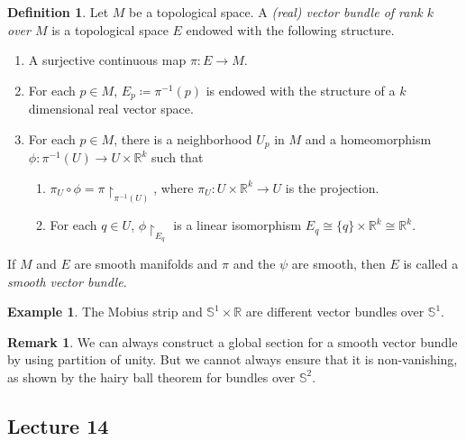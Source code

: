 \documentclass[10pt,letterpaper,cm]{nupset}
\theoremstyle{definition}
\newtheorem*{definition}{Definition}
\newtheorem{exmp}{Example}
\newtheorem{remark}{Remark}
\newcommand{\R}{\mathbb R}
\renewcommand{\S}{\mathbb S}
\newcommand{\1}{\mathbf{1}}
\newcommand{\0}{\vec 0}
\begin{document}
\begin{definition}
Let $M$ be a topological space. A \textit{(real) vector bundle of rank $k$ over $M$} is a topological space $E$ endowed with the following structure.
\begin{enumerate}
\item A surjective continuous map $\pi : E \to M$.
\item For each $p \in M$, $E_p\coloneqq  \pi^{-1}(p)$ is endowed with the structure of a $k$ dimensional real vector space.
\item For each $p\in M$, there is a neighborhood $U_p$ in $M$ and a homeomorphism $\phi :\pi^{-1}(U) \to U \times \R^k$ such that
\begin{enumerate}
\item $\pi_U \circ \phi  = \pi \restriction_{\pi^{-1}(U)}$, where $\pi_U : U \times \R^k \to U$ is the projection.
\item For each $q\in U$, $\phi \restriction_{E_q}$ is a linear isomorphism $E_q \cong \{q\} \times \R^k \cong \R^k.$
\end{enumerate}
\end{enumerate}
If $M$ and $E$ are smooth manifolds and $\pi$ and the $\psi$ are smooth, then $E$ is called a \textit{smooth vector bundle}.
\end{definition}

\begin{exmp}
The Mobius strip and $\S^1 \times \R$ are different vector bundles over $\S^1$.
\end{exmp}

\begin{remark}
We can always construct a global section for a smooth vector bundle by using partition of unity. But we cannot always ensure that it is non-vanishing, as shown by the hairy ball theorem for bundles over $\S^2$.
\end{remark}

\subsection{Lecture 14}
\end{document}
